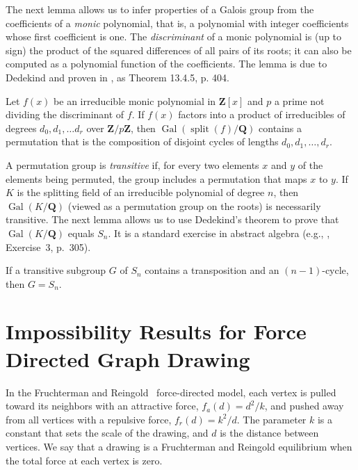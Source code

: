 \documentclass[oribibl,10pt]{llncs}
\newcommand{\rationals}{\mathbf{Q}}
\newcommand{\integers}{\mathbf{Z}}
\DeclareMathOperator{\Gal}{Gal}
\DeclareMathOperator{\splitting}{split}
\begin{document}
The next lemma allows us to infer properties of a Galois group from the coefficients of a \emph{monic} polynomial, that is, a polynomial with integer coefficients whose first coefficient is one. The \emph{discriminant} of a monic polynomial is (up to sign) the product of the squared differences of all pairs of its roots; it can also be computed as a polynomial function of the coefficients. The lemma is due to Dedekind and proven in \cite{Cox2012}\ifFull, as Theorem 13.4.5, p. 404\fi.

\begin{lemma}
Let $f(x)$ be an irreducible monic polynomial in $\integers[x]$ and $p$ a prime not dividing the discriminant of $f$. If $f(x)$ factors into a product of irreducibles of degrees $d_0, d_1, \ldots d_r$ over $\integers/p\integers$, then $\Gal(\splitting(f)/\rationals)$ contains a permutation that is the composition of disjoint cycles of lengths $d_0, d_1, \ldots, d_r$.
\end{lemma}

A permutation group is \emph{transitive} if, for every two elements $x$ and $y$ of the elements being permuted, the group includes a permutation that maps $x$ to $y$. If $K$ is the splitting field of an irreducible polynomial of degree $n$, then $\Gal(K/\rationals)$ (viewed as a permutation group on the roots) is necessarily transitive. The next lemma allows us to use Dedekind's theorem to prove that $\Gal(K/\rationals)$ equals $S_n$. It is a standard exercise in abstract algebra (e.g., \cite{Jac2012}, Exercise~3, p.~305).

\begin{lemma}
\label{lem:swap+cycle}
If a transitive subgroup  $G$ of $S_n$ contains a transposition and an $(n-1)$-cycle, then $G = S_n$.
\end{lemma}

\section{Impossibility Results for Force Directed Graph Drawing}
In the Fruchterman and Reingold~\cite{FruRei-SPE-1991} 
force-directed model, each vertex is pulled toward its neighbors with an attractive force, $f_a(d) = d^2/k$, and pushed away from all vertices with a repulsive force, $f_r(d) = k^2/d$. The parameter $k$ is a constant that sets the scale of the drawing, and $d$ is the distance between vertices. We say that a drawing is a Fruchterman and Reingold equilibrium when the total force at each vertex is zero.
\end{document}
